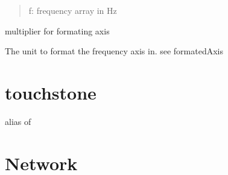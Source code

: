 \documentclass[letterpaper,10pt,english]{sphinxmanual}
\begin{document}
\begin{fulllineitems}
\begin{fulllineitems}
\begin{quote}
f: frequency array in Hz
\end{quote}

\end{fulllineitems}


\begin{fulllineitems}
\label{auto_frequency:mwavepy.Frequency.labelXAxis}
\end{fulllineitems}


\begin{fulllineitems}
\label{auto_frequency:mwavepy.Frequency.multiplier}
multiplier for formating axis

\end{fulllineitems}


\begin{fulllineitems}
\label{auto_frequency:mwavepy.Frequency.unit}
The unit to format the frequency axis in. see formatedAxis

\end{fulllineitems}


\end{fulllineitems}



\section{touchstone}
\label{auto_touchstone::doc}\label{auto_touchstone:touchstone}

\begin{fulllineitems}
\label{auto_touchstone:mwavepy.touchstone}
alias of {\hyperref[auto_touchstone:mwavepy.touchstone]{}}

\end{fulllineitems}



\section{Network}
\label{auto_network::doc}\label{auto_network:network}
\end{document}
